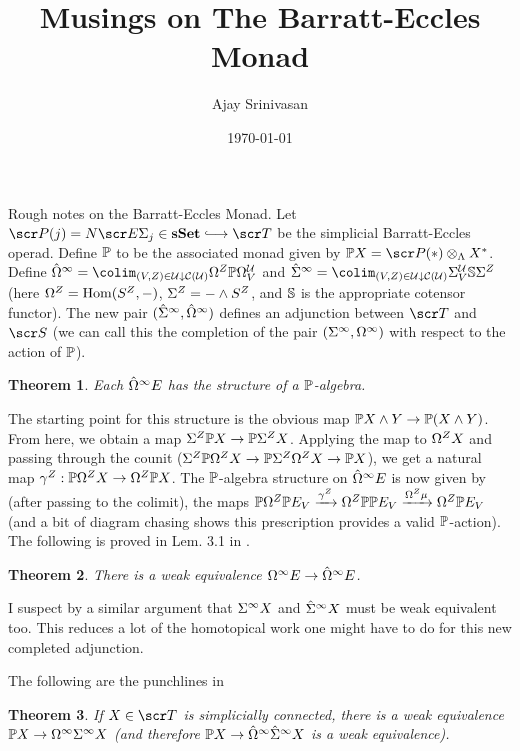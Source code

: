 \documentclass{amsart}
\title{Musings on The Barratt-Eccles Monad}
\author{Ajay Srinivasan}
\date{\today}
\newtheorem{thm}{Theorem}[section]
\theoremstyle{definition}
\begin{document}
\maketitle

Rough notes on the Barratt-Eccles Monad. Let $\sP(j) = N \sE \SI_j \in \mathbf{sSet} \monoto \sT$ be the simplicial Barratt-Eccles operad. Define $\mathbb{P}$ to be the associated monad given by $\bP X = \sP(*) \otimes_{\LA} X^{*}$. Define $\hat{\OM}^{\infty} = \colim_{(V,Z) \in \oU \downarrow \oC (\oU)} \OM^{Z} \bP \OM^{\oU}_{V}$ and $\hat{\SI}^{\infty} = \colim_{(V,Z) \in \oU \downarrow \oC (\oU)}\SI^{\oU}_{V} \bS \SI^{Z}$ (here $\Omega^Z = \mathrm{Hom}(S^Z,-)$, $\Sigma^{Z} = - \wedge S^Z$, and $\mathbb{S}$ is the appropriate cotensor functor). The new pair $(\hat{\Sigma}^{\infty},\hat{\Omega}^{\infty})$ defines an adjunction between $\sT$ and $\sS$ (we can call this the completion of the pair $(\Sigma^{\infty},\Omega^{\infty})$ with respect to the action of $\mathbb{P}$). 

\begin{thm}
Each $\hat{\Omega}^{\infty} E$ has the structure of a $\mathbb{P}$-algebra.
\end{thm}

The starting point for this structure is the obvious map $\mathbb{P} X \wedge Y \to \mathbb{P} (X \wedge Y)$. From here, we obtain a map $\Sigma^{Z} \mathbb{P} X \to \mathbb{P} \Sigma^Z X$. Applying the map to $\Omega^{Z} X$ and passing through the counit ($\Sigma^Z \mathbb{P} \Omega^Z X \to \mathbb{P} \Sigma^Z \Omega^Z X \to \mathbb{P} X$), we get a natural map $\gamma^Z : \mathbb{P} \Omega^Z X \to \Omega^Z \mathbb{P} X$. The $\mathbb{P}$-algebra structure on $\hat{\Omega}^{\infty}E$ is now given by (after passing to the colimit), the maps $\mathbb{P} \Omega^{Z} \mathbb{P} E_V \xrightarrow{\gamma^Z} \Omega^{Z} \mathbb{P} \mathbb{P} E_V \xrightarrow{\Omega^{Z}\mu} \Omega^{Z} \mathbb{P} E_V$ (and a bit of diagram chasing shows this prescription provides a valid $\mathbb{P}$-action).\\

The following is proved in Lem. 3.1 in  \cite{Barratt1974oper2}.

\begin{thm}
There is a weak equivalence $\Omega^{\infty}E \to \hat{\Omega}^{\infty} E$. 
\end{thm}

I suspect by a similar argument that $\Sigma^{\infty} X$ and $\hat{\Sigma}^{\infty} X$ must be weak equivalent too. This reduces a lot of the homotopical work one might have to do for this new completed adjunction.

The following are the punchlines in \cite{Barratt1974oper}

\begin{thm}
If $X \in \sT$ is simplicially connected, there is a weak equivalence $\mathbb{P} X \to \Omega^{\infty} \Sigma^{\infty} X$ (and therefore $\mathbb{P} X \to \hat{\Omega}^{\infty} \hat{\Sigma}^{\infty} X$ is a weak equivalence).
\end{thm}
\end{document}
